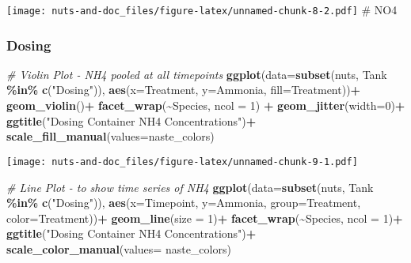 \documentclass[
]{article}
\newenvironment{Shaded}{\begin{snugshade}}{\end{snugshade}}
\newcommand{\AttributeTok}[1]{\textcolor[rgb]{0.13,0.29,0.53}{#1}}
\newcommand{\CommentTok}[1]{\textcolor[rgb]{0.56,0.35,0.01}{\textit{#1}}}
\newcommand{\DecValTok}[1]{\textcolor[rgb]{0.00,0.00,0.81}{#1}}
\newcommand{\FunctionTok}[1]{\textcolor[rgb]{0.13,0.29,0.53}{\textbf{#1}}}
\newcommand{\NormalTok}[1]{#1}
\newcommand{\SpecialCharTok}[1]{\textcolor[rgb]{0.81,0.36,0.00}{\textbf{#1}}}
\newcommand{\StringTok}[1]{\textcolor[rgb]{0.31,0.60,0.02}{#1}}
\begin{document}
\texttt{[image: nuts-and-doc\_files/figure-latex/unnamed-chunk-8-2.pdf]}
\# NO4

\hypertarget{dosing-2}{%
\subsubsection{Dosing}\label{dosing-2}}

\begin{Shaded}
\begin{Highlighting}[]
\CommentTok{\# Violin Plot {-} NH4 pooled at all timepoints}
\FunctionTok{ggplot}\NormalTok{(}\AttributeTok{data=}\FunctionTok{subset}\NormalTok{(nuts, Tank }\SpecialCharTok{\%in\%} \FunctionTok{c}\NormalTok{(}\StringTok{"Dosing"}\NormalTok{)), }\FunctionTok{aes}\NormalTok{(}\AttributeTok{x=}\NormalTok{Treatment, }\AttributeTok{y=}\NormalTok{Ammonia, }\AttributeTok{fill=}\NormalTok{Treatment))}\SpecialCharTok{+}
  \FunctionTok{geom\_violin}\NormalTok{()}\SpecialCharTok{+}
  \FunctionTok{facet\_wrap}\NormalTok{(}\SpecialCharTok{\textasciitilde{}}\NormalTok{Species, }\AttributeTok{ncol =} \DecValTok{1}\NormalTok{) }\SpecialCharTok{+}
  \FunctionTok{geom\_jitter}\NormalTok{(}\AttributeTok{width=}\DecValTok{0}\NormalTok{)}\SpecialCharTok{+}
  \FunctionTok{ggtitle}\NormalTok{(}\StringTok{"Dosing Container NH4 Concentrations"}\NormalTok{)}\SpecialCharTok{+}
  \FunctionTok{scale\_fill\_manual}\NormalTok{(}\AttributeTok{values=}\NormalTok{naste\_colors)}
\end{Highlighting}
\end{Shaded}

\texttt{[image: nuts-and-doc\_files/figure-latex/unnamed-chunk-9-1.pdf]}

\begin{Shaded}
\begin{Highlighting}[]
\CommentTok{\# Line Plot {-} to show time series of NH4}
\FunctionTok{ggplot}\NormalTok{(}\AttributeTok{data=}\FunctionTok{subset}\NormalTok{(nuts, Tank }\SpecialCharTok{\%in\%} \FunctionTok{c}\NormalTok{(}\StringTok{"Dosing"}\NormalTok{)), }\FunctionTok{aes}\NormalTok{(}\AttributeTok{x=}\NormalTok{Timepoint, }\AttributeTok{y=}\NormalTok{Ammonia, }\AttributeTok{group=}\NormalTok{Treatment, }\AttributeTok{color=}\NormalTok{Treatment))}\SpecialCharTok{+}
  \FunctionTok{geom\_line}\NormalTok{(}\AttributeTok{size =} \DecValTok{1}\NormalTok{)}\SpecialCharTok{+}
  \FunctionTok{facet\_wrap}\NormalTok{(}\SpecialCharTok{\textasciitilde{}}\NormalTok{Species, }\AttributeTok{ncol =} \DecValTok{1}\NormalTok{)}\SpecialCharTok{+}
  \FunctionTok{ggtitle}\NormalTok{(}\StringTok{"Dosing Container NH4 Concentrations"}\NormalTok{)}\SpecialCharTok{+}
  \FunctionTok{scale\_color\_manual}\NormalTok{(}\AttributeTok{values=}\NormalTok{ naste\_colors)}
\end{Highlighting}
\end{Shaded}
\end{document}
